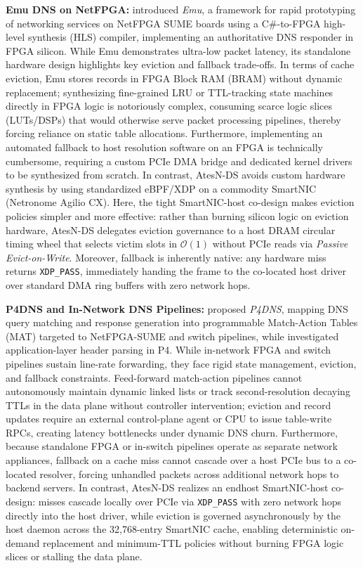 \documentclass[a4paper,fleqn,colorlinks,hidelinks]{cas-sc}
\begin{document}
\textbf{Emu DNS on NetFPGA:} \citet{203245} introduced \textit{Emu}, a framework for rapid prototyping of networking services on NetFPGA SUME boards using a C\#-to-FPGA high-level synthesis (HLS) compiler, implementing an authoritative DNS responder in FPGA silicon. While Emu demonstrates ultra-low packet latency, its standalone hardware design highlights key eviction and fallback trade-offs. In terms of cache eviction, Emu stores records in FPGA Block RAM (BRAM) without dynamic replacement; synthesizing fine-grained LRU or TTL-tracking state machines directly in FPGA logic is notoriously complex, consuming scarce logic slices (LUTs/DSPs) that would otherwise serve packet processing pipelines, thereby forcing reliance on static table allocations. Furthermore, implementing an automated fallback to host resolution software on an FPGA is technically cumbersome, requiring a custom PCIe DMA bridge and dedicated kernel drivers to be synthesized from scratch. In contrast, AtesN-DS avoids custom hardware synthesis by using standardized eBPF/XDP on a commodity SmartNIC (Netronome Agilio CX). Here, the tight SmartNIC-host co-design makes eviction policies simpler and more effective: rather than burning silicon logic on eviction hardware, AtesN-DS delegates eviction governance to a host DRAM circular timing wheel that selects victim slots in $\mathcal{O}(1)$ without PCIe reads via \textit{Passive Evict-on-Write}. Moreover, fallback is inherently native: any hardware miss returns \texttt{XDP\_PASS}, immediately handing the frame to the co-located host driver over standard DMA ring buffers with zero network hops.

\textbf{P4DNS and In-Network DNS Pipelines:} \citet{woodruff2019p4dns} proposed \textit{P4DNS}, mapping DNS query matching and response generation into programmable Match-Action Tables (MAT) targeted to NetFPGA-SUME and switch pipelines, while \citet{10619855} investigated application-layer header parsing in P4. While in-network FPGA and switch pipelines sustain line-rate forwarding, they face rigid state management, eviction, and fallback constraints. Feed-forward match-action pipelines cannot autonomously maintain dynamic linked lists or track second-resolution decaying TTLs in the data plane without controller intervention; eviction and record updates require an external control-plane agent or CPU to issue table-write RPCs, creating latency bottlenecks under dynamic DNS churn. Furthermore, because standalone FPGA or in-switch pipelines operate as separate network appliances, fallback on a cache miss cannot cascade over a host PCIe bus to a co-located resolver, forcing unhandled packets across additional network hops to backend servers. In contrast, AtesN-DS realizes an endhost SmartNIC-host co-design: misses cascade locally over PCIe via \texttt{XDP\_PASS} with zero network hops directly into the host driver, while eviction is governed asynchronously by the host daemon across the 32,768-entry SmartNIC cache, enabling deterministic on-demand replacement and minimum-TTL policies without burning FPGA logic slices or stalling the data plane.
\end{document}
